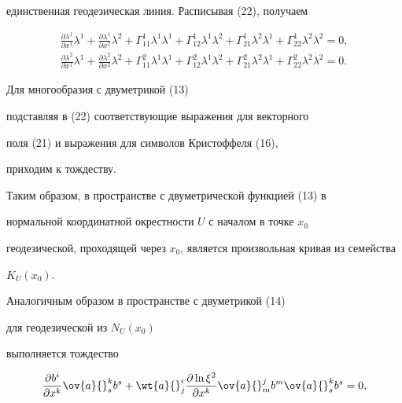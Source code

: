 единственная геодезическая линия. Расписывая (22), получаем


\begin{gather*}


\frac{\partial \lambda^1}{\partial x^1}\lambda^1 +


\frac{\partial \lambda^1}{\partial x^2}\lambda^2 +


\Gamma^1_{11}\lambda^1\lambda^1 +


\Gamma^1_{12}\lambda^1\lambda^2 +


\Gamma^1_{21}\lambda^2\lambda^1 +


\Gamma^1_{22}\lambda^2\lambda^2=0, \\


\frac{\partial \lambda^2}{\partial x^1}\lambda^1 +


\frac{\partial \lambda^2}{\partial x^2}\lambda^2 +


\Gamma^2_{11}\lambda^1\lambda^1 +


\Gamma^2_{12}\lambda^1\lambda^2 +


\Gamma^2_{21}\lambda^2\lambda^1 +


\Gamma^2_{22}\lambda^2\lambda^2=0.


\end{gather*}





Для многообразия с двуметрикой (13)


подставляя в (22) соответствующие выражения для векторного


поля (21) и выражения для символов Кристоффеля (16),


приходим к тождеству.


Таким образом, в пространстве с двуметрической функцией (13) в


нормальной координатной окрестности $U$ с началом в точке $x_0$


геодезической, проходящей через $x_0$, является произвольная кривая из семейства


$K_U(x_0)$.


Аналогичным образом в пространстве с двуметрикой (14)


для геодезической из $N_U(x_0)$


выполняется тождество


\begin{equation}


\frac{\partial b^i}{\partial x^k}\ov{a}{}^k_sb^s +


\wt{a}{}^i_j\frac{\partial


\ln\xi^2}{\partial x^k}\ov{a}{}^j_mb^m\ov{a}{}^k_sb^s=0,


\end{equation}


